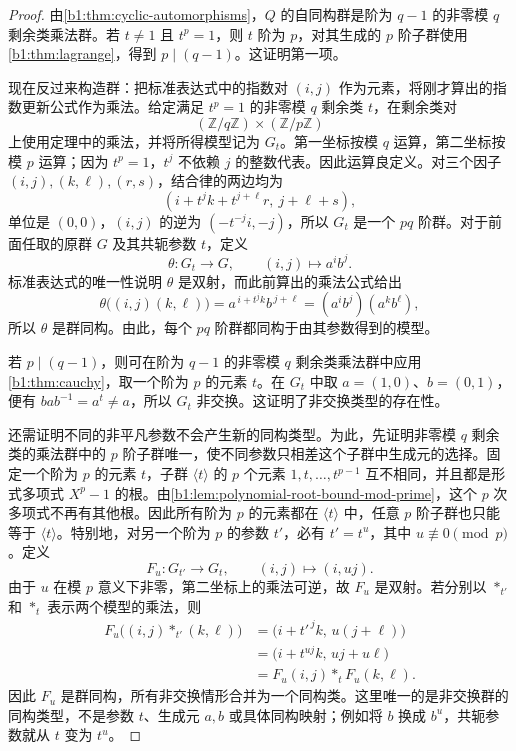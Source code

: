 \begin{proof}
	由\cref{b1:thm:cyclic-automorphisms}，\(Q\) 的自同构群是阶为 \(q-1\) 的非零模 \(q\) 剩余类乘法群。若 \(t\neq1\) 且 \(t^p=1\)，则 \(t\) 阶为 \(p\)，对其生成的 \(p\) 阶子群使用\cref{b1:thm:lagrange}，得到 \(p\mid(q-1)\)。这证明第一项。

	现在反过来构造群：把标准表达式中的指数对 \((i,j)\) 作为元素，将刚才算出的指数更新公式作为乘法。给定满足 \(t^p=1\) 的非零模 \(q\) 剩余类 \(t\)，在剩余类对
	\[
		(\mathbb Z/q\mathbb Z)\times(\mathbb Z/p\mathbb Z)
	\]
	上使用定理中的乘法，并将所得模型记为 \(G_t\)。第一坐标按模 \(q\) 运算，第二坐标按模 \(p\) 运算；因为 \(t^p=1\)，\(t^j\) 不依赖 \(j\) 的整数代表。因此运算良定义。对三个因子 \((i,j),(k,\ell),(r,s)\)，结合律的两边均为
	\[
		(i+t^jk+t^{j+\ell}r,\ j+\ell+s),
	\]
	单位是 \((0,0)\)，\((i,j)\) 的逆为 \((-t^{-j}i,-j)\)，所以 \(G_t\) 是一个 \(pq\) 阶群。对于前面任取的原群 \(G\) 及其共轭参数 \(t\)，定义
	\[
		\theta:G_t\longrightarrow G, \qquad (i,j)\longmapsto a^ib^j.
	\]
	标准表达式的唯一性说明 \(\theta\) 是双射，而此前算出的乘法公式给出
	\[
		\theta\bigl((i,j)(k,\ell)\bigr) =a^{\,i+t^jk}b^{\,j+\ell} =(a^ib^j)(a^kb^\ell),
	\]
	所以 \(\theta\) 是群同构。由此，每个 \(pq\) 阶群都同构于由其参数得到的模型。

	若 \(p\mid(q-1)\)，则可在阶为 \(q-1\) 的非零模 \(q\) 剩余类乘法群中应用\cref{b1:thm:cauchy}，取一个阶为 \(p\) 的元素 \(t\)。在 \(G_t\) 中取 \(a=(1,0)\)、\(b=(0,1)\)，便有 \(bab^{-1}=a^t\neq a\)，所以 \(G_t\) 非交换。这证明了非交换类型的存在性。

	还需证明不同的非平凡参数不会产生新的同构类型。为此，先证明非零模 \(q\) 剩余类的乘法群中的 \(p\) 阶子群唯一，使不同参数只相差这个子群中生成元的选择。固定一个阶为 \(p\) 的元素 \(t\)，子群 \(\langle t\rangle\) 的 \(p\) 个元素 \(1,t,\ldots,t^{p-1}\) 互不相同，并且都是形式多项式 \(X^p-1\) 的根。由\cref{b1:lem:polynomial-root-bound-mod-prime}，这个 \(p\) 次多项式不再有其他根。因此所有阶为 \(p\) 的元素都在 \(\langle t\rangle\) 中，任意 \(p\) 阶子群也只能等于 \(\langle t\rangle\)。特别地，对另一个阶为 \(p\) 的参数 \(t'\)，必有 \(t'=t^u\)，其中 \(u\not\equiv0\pmod p\)。定义
	\[
		F_u:G_{t'}\longrightarrow G_t, \qquad (i,j)\longmapsto(i,uj).
	\]
	由于 \(u\) 在模 \(p\) 意义下非零，第二坐标上的乘法可逆，故 \(F_u\) 是双射。若分别以 \(*_{t'}\) 和 \(*_t\) 表示两个模型的乘法，则
	\[
		\begin{aligned}
			F_u\bigl((i,j)*_{t'}(k,\ell)\bigr) &=\bigl(i+t'^{\,j}k,\,u(j+\ell)\bigr)\\
			&=\bigl(i+t^{uj}k,\,uj+u\ell\bigr)\\
			&=F_u(i,j)*_tF_u(k,\ell).
		\end{aligned}
	\]
	因此 \(F_u\) 是群同构，所有非交换情形合并为一个同构类。这里唯一的是非交换群的同构类型，不是参数 \(t\)、生成元 \(a,b\) 或具体同构映射；例如将 \(b\) 换成 \(b^u\)，共轭参数就从 \(t\) 变为 \(t^u\)。
\end{proof}

